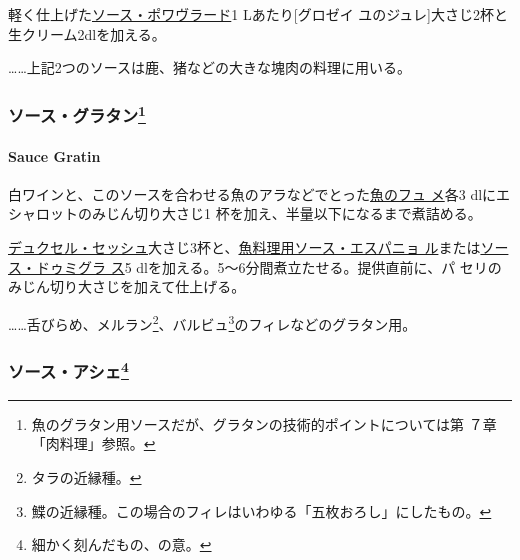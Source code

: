 \begin{recette}
軽く仕上げた\protect\hyperlink{sauce-poivrade}{ソース・ポワヴラード}1
Lあたり{[}グロゼイ
ユのジュレ{]}大さじ2杯と生クリーム2\undemi{}dlを加える。

\ldots{}\ldots{}上記2つのソースは鹿、猪などの大きな塊肉の料理に用いる。

\maeaki

\hypertarget{ux30bdux30fcux30b9ux30b0ux30e9ux30bfux30f345}{%
\subsubsection[ソース・グラタン]{\texorpdfstring{ソース・グラタン\footnote{魚のグラタン用ソースだが、グラタンの技術的ポイントについては第
  ７章「肉料理」参照。}}{ソース・グラタン}}\label{ux30bdux30fcux30b9ux30b0ux30e9ux30bfux30f345}}

\hypertarget{sauce-gratin}{%
\paragraph{Sauce Gratin}\label{sauce-gratin}}


白ワインと、このソースを合わせる魚のアラなどでとった\protect\hyperlink{fumet-de-poisson}{魚のフュ
メ}各3 dlにエシャロットのみじん切り大さじ1\undemi{}
杯を加え、半量以下になるまで煮詰める。

\protect\hyperlink{}{デュクセル・セッシュ}大さじ3杯と、\protect\hyperlink{sauce-espagnole-maigre}{魚料理用ソース・エスパニョ
ル}または\protect\hyperlink{sauce-demi-glace}{ソース・ドゥミグラ ス}5
dlを加える。5〜6分間煮立たせる。提供直前に、パ
セリのみじん切り大さじ\undemi{}を加えて仕上げる。

\ldots{}\ldots{}舌びらめ、メルラン\footnote{タラの近縁種。}、バルビュ\footnote{鰈の近縁種。この場合のフィレはいわゆる「五枚おろし」にしたもの。}のフィレなどのグラタン用。

\maeaki

\hypertarget{ux30bdux30fcux30b9ux30a2ux30b7ux30a743}{%
\subsubsection[ソース・アシェ]{\texorpdfstring{ソース・アシェ\footnote{細かく刻んだもの、の意。}}{ソース・アシェ}}\label{ux30bdux30fcux30b9ux30a2ux30b7ux30a743}}


\end{recette}
